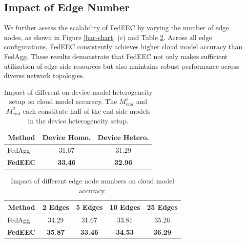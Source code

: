 \documentclass[10pt,journal]{IEEEtran}
\begin{document}
\subsection{Impact of Edge Number}
We further assess the scalability of FedEEC by varying the number of edge nodes, as shown in Figure \ref{bar-chart} (c) and Table \ref{ablation-edge}. Across all edge configurations, FedEEC consistently achieves higher cloud model accuracy than FedAgg. These results demonstrate that FedEEC not only makes sufficient utilization of edge-side resources but also maintains robust performance across diverse network topologies.


\begin{table}[t]
\centering
\caption{Impact of different on-device model heterogeneity setup on cloud model accuracy. The $M^1_{end}$ and $M^2_{end}$ each constitute half of the end-side models in the device heterogeneity setup.}
\label{ablation-model}
\setlength{\tabcolsep}{9pt}
\renewcommand{\arraystretch}{0.9}
\begin{tabular}{l|cc}
\hline
\multicolumn{1}{c|}{\textbf{Method}} & \textbf{Device Homo.} & \textbf{Device Hetero.} \\ \hline
FedAgg                               & 31.67                 & 31.29                   \\
\textbf{FedEEC}                      & \textbf{33.46}        & \textbf{32.96}          \\ \hline
\end{tabular}
\end{table}


\begin{table}[t]
\centering
\caption{Impact of different edge node numbers on cloud model accuracy.}
\label{ablation-edge}
\setlength{\tabcolsep}{5pt}
\renewcommand{\arraystretch}{0.9}
\begin{tabular}{l|cccc}
\hline
\multicolumn{1}{c|}{\textbf{Method}} & \textbf{2 Edges} & \textbf{5 Edges} & \textbf{10 Edges} & \textbf{25 Edges} \\ \hline
FedAgg                               & 34.29            & 31.67            & 33.81             & 35.26             \\
\textbf{FedEEC}                      & \textbf{35.87}   & \textbf{33.46}   & \textbf{34.53}    & \textbf{36.29}    \\ \hline
\end{tabular}
\end{table}
\end{document}
